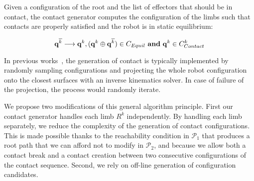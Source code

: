 Given a configuration of the root and the list of effectors that should be in contact, the contact generator computes the configuration of the limbs such that contacts are properly satisfied and the robot is in static equilibrium:

\begin{equation}
\label{eq:contact_gen}
	\mathbf{q}^{\overline{k}}  \longrightarrow \mathbf{q}^k, (\mathbf{q}^{k} \oplus \mathbf{q}^{\overline{k}}) \in  C_{Equil} \textrm{ \textbf{and}}\ \mathbf{q}^k \in  C_{Contact}^k 
\end{equation}

In previous works~\cite{DBLP:conf/iser/EscandeKMG08,Bouyarmane2009}, the generation of contact is typically implemented by randomly sampling configurations and projecting the whole robot configuration onto the closest surfaces with an inverse kinematics solver.
In case of failure of the projection, the process would randomly iterate.


We propose two modifications of this general algorithm principle.
First our contact generator handles each limb $R^k$ independently.
By handling each limb separately, we reduce the complexity of the generation of contact configurations.
This is made possible thanks to the reachability condition in $\mathcal{P}_1$ that produces a root path that we can afford not to modify in $\mathcal{P}_2$, and because we allow both a contact break and a contact creation between two consecutive configurations of the contact sequence.
Second, we rely on off-line generation of configuration candidates.





